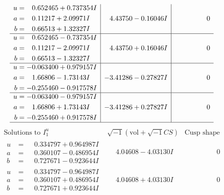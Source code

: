 \documentclass[1p]{elsarticle_modified}
\theoremstyle{definition}
\newcommand{\I}{\sqrt{-1}}
\begin{document}
$$\begin{array}{c|c|c}
\begin{aligned}
u &= \phantom{-}0.652465 + 0.737354 I \\
a &= \phantom{-}0.11217 + 2.09971 I \\
b &= \phantom{-}0.66513 + 1.32327 I\end{aligned}
 & \phantom{-}4.43750 - 0.16046 I & \phantom{-0.000000 } 0 \\ \hline\begin{aligned}
u &= \phantom{-}0.652465 - 0.737354 I \\
a &= \phantom{-}0.11217 - 2.09971 I \\
b &= \phantom{-}0.66513 - 1.32327 I\end{aligned}
 & \phantom{-}4.43750 + 0.16046 I & \phantom{-0.000000 } 0 \\ \hline\begin{aligned}
u &= -0.063400 + 0.979157 I \\
a &= \phantom{-}1.66806 - 1.73143 I \\
b &= -0.255460 - 0.917578 I\end{aligned}
 & -3.41286 - 0.27827 I & \phantom{-0.000000 } 0 \\ \hline\begin{aligned}
u &= -0.063400 - 0.979157 I \\
a &= \phantom{-}1.66806 + 1.73143 I \\
b &= -0.255460 + 0.917578 I\end{aligned}
 & -3.41286 + 0.27827 I & \phantom{-0.000000 } 0\\
 \hline 
 \end{array}$$\newpage$$\begin{array}{c|c|c}  
\text{Solutions to }I^u_{1}& \I (\text{vol} + \sqrt{-1}CS) & \text{Cusp shape}\\
 \hline 
\begin{aligned}
u &= \phantom{-}0.334797 + 0.964987 I \\
a &= \phantom{-}0.360107 - 0.486954 I \\
b &= \phantom{-}0.727671 - 0.923644 I\end{aligned}
 & \phantom{-}4.04608 - 4.03130 I & \phantom{-0.000000 } 0 \\ \hline\begin{aligned}
u &= \phantom{-}0.334797 - 0.964987 I \\
a &= \phantom{-}0.360107 + 0.486954 I \\
b &= \phantom{-}0.727671 + 0.923644 I\end{aligned}
 & \phantom{-}4.04608 + 4.03130 I & \phantom{-0.000000 } 0 \\ \hline\begin{aligned}

\end{aligned}
\end{array}$$
\end{document}
